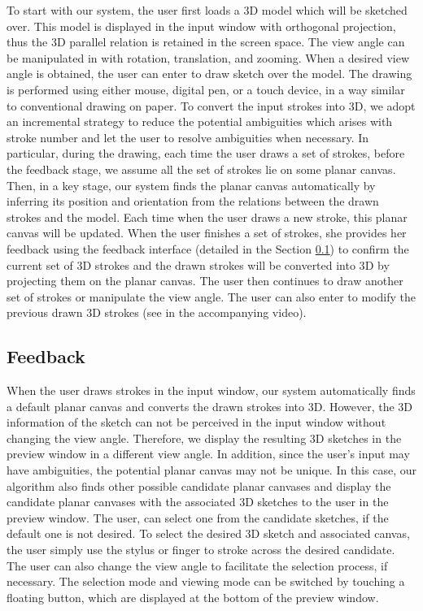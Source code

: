 To start with our system, the user first loads a 3{D} model which will be sketched over. This model is displayed in the input window with orthogonal projection, thus the 3D parallel relation is retained in the screen space. The view angle can be manipulated in  with rotation, translation, and zooming. When a desired view angle is obtained, the user can  enter  to draw sketch over the model. The drawing is performed using either mouse, digital pen, or a touch device, in a way similar to conventional drawing on paper. To convert the input strokes into 3D, we adopt an incremental strategy to reduce the potential ambiguities which arises with stroke number and let the user to resolve ambiguities when necessary. In particular, during the drawing, each time the user draws a set of strokes, before the feedback stage, we assume all the set of strokes lie on some planar canvas. Then, in a key stage, our system finds the planar canvas automatically by inferring its position and orientation from the relations between the drawn strokes and the model. Each time when the user draws a new stroke, this planar canvas will be updated. When the user finishes a set of strokes, she provides her feedback using the feedback interface (detailed in the Section \ref{sec:feedback}) to confirm the current set of 3{D} strokes and the drawn strokes will be converted into 3{D} by projecting them on the planar canvas. The user then continues to draw another set of strokes or manipulate the view angle. The user can also enter  to modify the previous drawn 3D strokes (see in the accompanying video).


\subsection{Feedback}\label{sec:feedback}
When the user draws strokes in the input window, our system automatically finds a default planar canvas and converts the drawn strokes into 3{D}. However, the 3{D} information of the sketch can not be perceived in the input window without changing the view angle. Therefore, we display the resulting 3{D} sketches in the preview window in a different view angle. In addition, since the user's input may have ambiguities, the potential planar canvas may not be unique. In this case, our algorithm also finds other possible candidate planar canvases and display the candidate planar canvases with the associated 3{D} sketches to the user in the preview window. The user, can select one from the candidate sketches, if the default one is not desired. To select the desired 3D sketch and associated canvas, the user simply use the stylus or finger to stroke across the desired candidate.  The user can also change the view angle to facilitate the selection process, if necessary. The selection mode and viewing mode can be switched by touching a floating button, which are displayed at the bottom of the preview window.


